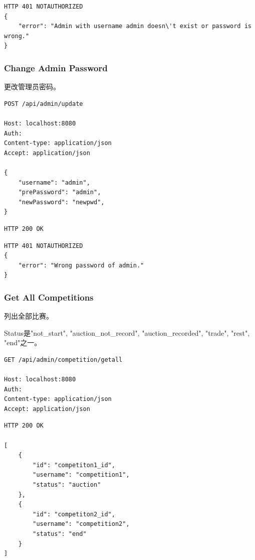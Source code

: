 \documentclass[12pt, a4paper,UTF8]{article}
\begin{document}
\begin{lstlisting}
HTTP 401 NOTAUTHORIZED
{
    "error": "Admin with username admin doesn\'t exist or password is wrong."
}
\end{lstlisting}

\subsubsection{Change Admin Password}
更改管理员密码。

\begin{lstlisting}
POST /api/admin/update

Host: localhost:8080
Auth:
Content-type: application/json
Accept: application/json

{
    "username": "admin",
    "prePassword": "admin",
    "newPassword": "newpwd",
}
\end{lstlisting}

\begin{lstlisting}
HTTP 200 OK

\end{lstlisting}

\begin{lstlisting}
HTTP 401 NOTAUTHORIZED
{
    "error": "Wrong password of admin."
}
\end{lstlisting}


\subsubsection{Get All Competitions}

列出全部比赛。

Status是"not\_start", "auction\_not\_record", "auction\_recorded", "trade", "rest", "end"之一。

\begin{lstlisting}
GET /api/admin/competition/getall

Host: localhost:8080
Auth:
Content-type: application/json
Accept: application/json
\end{lstlisting}

\begin{lstlisting}
HTTP 200 OK

[
    {
        "id": "competiton1_id",
        "username": "competition1",
        "status": "auction"
    },
    {
        "id": "competiton2_id",
        "username": "competition2",
        "status": "end"
    }
]
\end{lstlisting}
\end{document}
